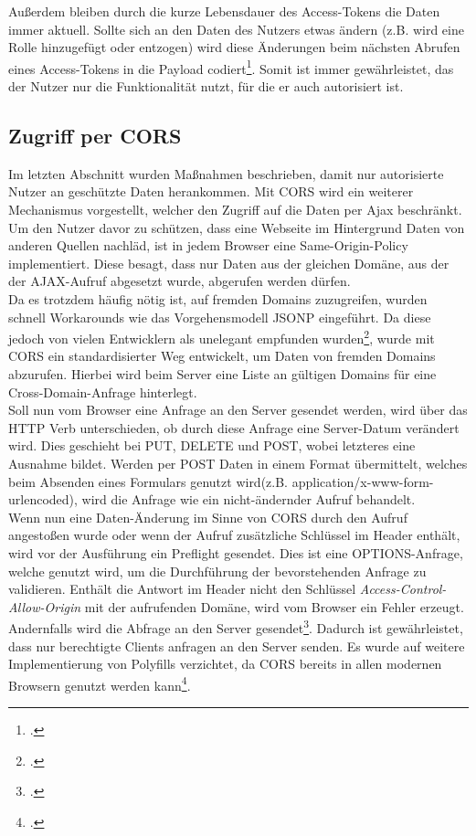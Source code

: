 Außerdem bleiben durch die kurze Lebensdauer des Access-Tokens die Daten immer aktuell. Sollte sich an den Daten des Nutzers etwas ändern (z.B. wird eine Rolle hinzugefügt oder entzogen) wird diese Änderungen beim nächsten Abrufen eines Access-Tokens in die Payload codiert\footcite{online:Implemented_OAuth_RefreshToken}. Somit ist immer gewährleistet, das der Nutzer nur die Funktionalität nutzt, für die er auch autorisiert ist. 
\subsection{Zugriff per CORS}
\label{ssec:cors}
Im letzten Abschnitt wurden Maßnahmen beschrieben, damit nur autorisierte Nutzer an geschützte Daten herankommen. Mit \ac{CORS} wird ein weiterer Mechanismus vorgestellt, welcher den Zugriff auf die Daten per \ac{Ajax} beschränkt. \\
Um den Nutzer davor zu schützen, dass eine Webseite im Hintergrund Daten von anderen Quellen nachläd, ist in jedem Browser eine \ac{Same-Origin-Policy} implementiert. Diese besagt, dass nur Daten aus der gleichen Domäne, aus der der AJAX-Aufruf abgesetzt wurde, abgerufen werden dürfen. \\
Da es trotzdem häufig nötig ist, auf fremden Domains zuzugreifen, wurden schnell Workarounds wie das Vorgehensmodell \ac{JSONP} eingeführt. Da diese jedoch von vielen Entwicklern als unelegant empfunden wurden\footcite[S. 102]{book:AngularJs:Steyer2015}, wurde mit CORS ein standardisierter Weg entwickelt, um Daten von fremden Domains abzurufen. Hierbei wird beim Server eine Liste an gültigen Domains für eine Cross-Domain-Anfrage hinterlegt.  \\
Soll nun vom Browser eine Anfrage an den Server gesendet werden, wird über das HTTP Verb unterschieden, ob durch diese Anfrage eine Server-Datum verändert wird. Dies geschieht bei PUT, DELETE und POST, wobei letzteres eine Ausnahme bildet. Werden per POST Daten in einem Format übermittelt, welches beim Absenden eines Formulars genutzt wird(z.B. application/x-www-form-urlencoded), wird die Anfrage wie ein nicht-ändernder Aufruf behandelt. \\
Wenn nun eine Daten-Änderung im Sinne von CORS durch den Aufruf angestoßen wurde oder wenn der Aufruf zusätzliche Schlüssel im Header enthält, wird vor der Ausführung ein \ac{Preflight} gesendet. Dies ist eine OPTIONS-Anfrage, welche genutzt wird, um die Durchführung der bevorstehenden Anfrage zu validieren.
Enthält die Antwort im Header nicht den Schlüssel \textit{Access-Control-Allow-Origin} mit der aufrufenden Domäne, wird vom Browser ein Fehler erzeugt. Andernfalls wird die Abfrage an den Server gesendet\footcite[S. 102]{book:AngularJs:Steyer2015}. Dadurch ist gewährleistet, dass nur berechtigte Clients anfragen an den Server senden. Es wurde auf weitere Implementierung von \ac{Polyfills} verzichtet, da CORS bereits in allen modernen Browsern genutzt werden kann\footcite{online:can-i-use:cors}.
